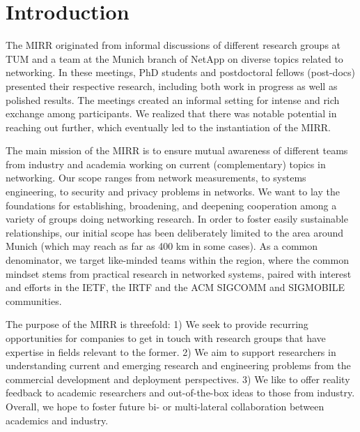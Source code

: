 \section{Introduction} \label{sec:introduction}


The \ac{MIRR} originated from informal discussions of different research groups at \ac{TUM} and a team at the Munich branch of NetApp\cite{netapp} on diverse topics related to networking. In these meetings, PhD students and postdoctoral fellows (post-docs) presented their respective research, including both work in progress as well as polished results. The meetings created an informal setting for intense and rich exchange among participants. We realized that there was notable potential in reaching out further, which eventually led to the instantiation of the \ac{MIRR}.

The main mission of the \ac{MIRR} is to ensure mutual awareness of different
teams from industry and academia working on current (complementary) topics in networking. Our scope ranges from network measurements, to systems engineering, to security and privacy problems in networks. We want to lay the foundations for establishing, broadening, and deepening cooperation among a variety of groups doing networking research. In order to foster easily sustainable relationships, our initial scope has been deliberately limited to the area around Munich (which may reach as far as 400 km in some cases).  As a common denominator, we target like-minded teams within the region, where the common mindset stems from practical research in networked systems, paired with interest and efforts in the \ac{IETF}, the \ac{IRTF} and the ACM SIGCOMM and SIGMOBILE communities.

The purpose of the \ac{MIRR} is threefold: 1) We seek to provide recurring
opportunities for companies to get in touch with research groups that have
expertise in fields relevant to the former.  2) We aim to support researchers
in understanding current and emerging research and engineering problems from
the commercial development and deployment perspectives.  3) We like to offer
reality feedback to academic researchers and out-of-the-box ideas to those
from industry.  Overall, we hope to foster future bi- or multi-lateral
collaboration between academics and industry.


